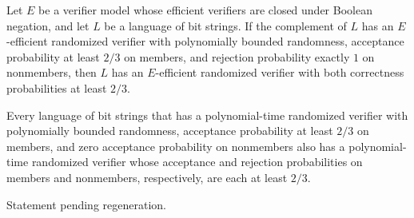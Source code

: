 \begin{theorem}
\label{Randomized.InCoRP.inBPP}
\leanok
{}
Let $E$ be a verifier model whose efficient verifiers are closed under Boolean negation,
and let $L$ be a language of bit strings. If the complement of $L$ has an $E$-efficient
randomized verifier with polynomially bounded randomness, acceptance probability at
least $2/3$ on members, and rejection probability exactly $1$ on nonmembers, then $L$
has an $E$-efficient randomized verifier with both correctness probabilities at least
$2/3$.
\end{theorem}

\begin{theorem}
\label{Randomized.InCoRP.inBPP_polyTime}
\leanok
{}
Every language of bit strings that has a polynomial-time randomized verifier with
polynomially bounded randomness, acceptance probability at least $2/3$ on members, and
zero acceptance probability on nonmembers also has a polynomial-time randomized verifier
whose acceptance and rejection probabilities on members and nonmembers, respectively,
are each at least $2/3$.
\end{theorem}

\begin{theorem}
\label{Randomized.inBPP_polyTimeModel_of_mem_P}
\leanok
{}
Statement pending regeneration.
\end{theorem}

